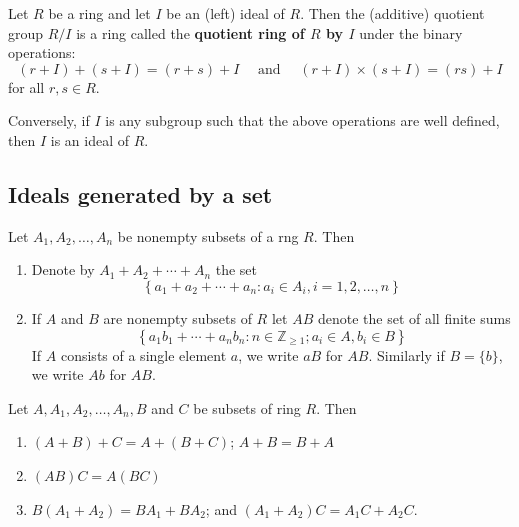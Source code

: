\begin{definition}
    Let $R$ be a ring and let $I$ be an (left) ideal of $R$. Then the (additive) quotient group $R / I$ is a ring called the \textbf{quotient ring of $R$ by $I$} under the binary operations:
    \begin{equation*}
        (r+I)+(s+I)=(r+s)+I \quad \text { and } \quad(r+I) \times(s+I)=(r s)+I
    \end{equation*}
    for all $r, s \in R$.

    Conversely, if $I$ is any subgroup such that the above operations are well defined, then $I$ is an ideal of $R$.
\end{definition}


\subsection{Ideals generated by a set}
\begin{definition}
    Let $A_1, A_2, \ldots, A_n$ be nonempty subsets of a rng $R$.
    Then
    \begin{enumerate}
        \item Denote by $A_1+A_2+\cdots+A_n$ the set
              \begin{equation*}
                  \left\{a_1+a_2+\cdots+a_n : a_i \in A_i, i=1,2, \ldots, n\right\}
              \end{equation*}

        \item
              If $A$ and $B$ are nonempty subsets of $R$ let $A B$ denote the set of all finite sums
              \begin{equation*}
                  \left\{a_1 b_1+\cdots+a_n b_n : n \in \mathbb{Z}_{\geq 1} ; a_i \in A , b_i \in B \right\}
              \end{equation*}
              If $A$ consists of a single element $a$, we write $a B$ for $A B$. Similarly if $B=\{b\}$, we write $A b$ for $A B$.
    \end{enumerate}
\end{definition}

\begin{theorem}
    Let $A, A_1, A_2, \ldots, A_{{n}}, {B}$ and $C$ be subsets of ring $R$.
    Then
    \begin{enumerate}
        \item  $(A+{B})+{C}=A+({B}+{C})$; $A+B=B+A$

        \item $(AB) {C}=A(BC)$

        \item ${B}\left(A_1+A_2\right)={BA}_1+{BA}_2$; and $\left(A_1+A_2\right) {C}=A_1 {C}+A_2 {C}$.
    \end{enumerate}
\end{theorem}

